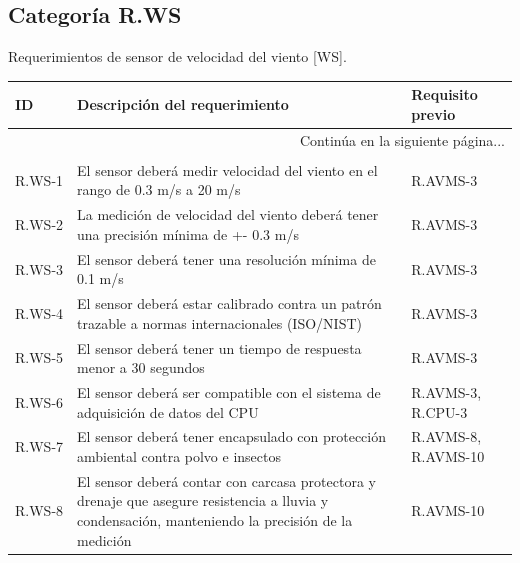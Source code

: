 \documentclass{article}%
\begin{document}
\subsection{Categoría R.WS}%
\label{subsec:CategoraR.WS}%
Requerimientos de sensor de velocidad del viento [WS].\newline%
\newline%
%
\begin{longtable}{|p{2cm}|p{9cm}|p{2.5cm}|}%
\hline%
ID&Descripción del requerimiento&Requisito previo\\%
\hline%
\endhead%
\hline%
\multicolumn{3}{|r|}{Continúa en la siguiente página...}\\%
\hline%
\endfoot%
\hline%
\multicolumn{3}{|r|}{Fin de la tabla}\\%
\hline%
\endlastfoot%
R.WS{-}1& El sensor deberá medir velocidad del viento en el rango de 0.3 m/s a 20 m/s& R.AVMS{-}3\\%
\hline%
R.WS{-}2& La medición de velocidad del viento deberá tener una precisión mínima de +{-} 0.3 m/s& R.AVMS{-}3\\%
\hline%
R.WS{-}3& El sensor deberá tener una resolución mínima de 0.1 m/s& R.AVMS{-}3\\%
\hline%
R.WS{-}4& El sensor deberá estar calibrado contra un patrón trazable a normas internacionales (ISO/NIST)& R.AVMS{-}3\\%
\hline%
R.WS{-}5& El sensor deberá tener un tiempo de respuesta menor a 30 segundos& R.AVMS{-}3\\%
\hline%
R.WS{-}6& El sensor deberá ser compatible con el sistema de adquisición de datos del CPU& R.AVMS{-}3, R.CPU{-}3\\%
\hline%
R.WS{-}7& El sensor deberá tener encapsulado con protección ambiental contra polvo e insectos& R.AVMS{-}8, R.AVMS{-}10\\%
\hline%
R.WS{-}8& El sensor deberá contar con carcasa protectora y drenaje que asegure resistencia a lluvia y condensación, manteniendo la precisión de la medición& R.AVMS{-}10\\%
\hline%
\end{longtable}

%
\newpage%
\end{document}

